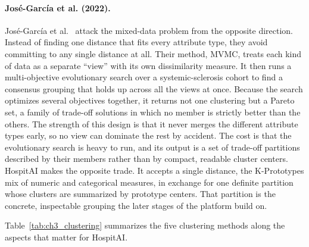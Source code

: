 \paragraph{José-García et al. (2022).}
José-García et al.~\cite{josegarcia2022} attack the mixed-data problem from the opposite direction.
Instead of finding one distance that fits every attribute type, they avoid committing to any single distance at all.
Their method, MVMC, treats each kind of data as a separate ``view'' with its own dissimilarity measure.
It then runs a multi-objective evolutionary search over a systemic-sclerosis cohort to find a consensus grouping that holds up across all the views at once.
Because the search optimizes several objectives together, it returns not one clustering but a Pareto set, a family of trade-off solutions in which no member is strictly better than the others.
The strength of this design is that it never merges the different attribute types early, so no view can dominate the rest by accident.
The cost is that the evolutionary search is heavy to run, and its output is a set of trade-off partitions described by their members rather than by compact, readable cluster centers.
HospitAI makes the opposite trade.
It accepts a single distance, the K-Prototypes mix of numeric and categorical measures, in exchange for one definite partition whose clusters are summarized by prototype centers.
That partition is the concrete, inspectable grouping the later stages of the platform build on.

\medskip
Table~\ref{tab:ch3_clustering} summarizes the five clustering methods along the aspects that matter for HospitAI.

